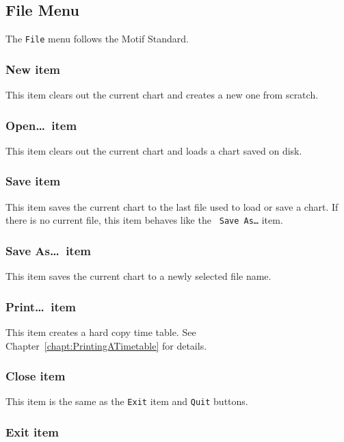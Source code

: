 \subsection{File Menu}

The {\tt File} menu follows the Motif Standard.

\subsubsection{New item}

This item clears out the current chart and creates a new one from scratch.

\subsubsection{Open\ldots\ item}

This item clears out the current chart and loads a chart saved on disk.

\subsubsection{Save item}

This item saves the current chart to the last file used to load or save
a chart.  If there is no current file, this item behaves like the {\tt
Save As\ldots} item.

\subsubsection{Save As\ldots\ item}

This item saves the current chart to a newly selected file name.

\subsubsection{Print\ldots\ item}

This item creates a hard copy time table.  See
Chapter~\ref{chapt:PrintingATimetable} for details.

\subsubsection{Close item}

This item is the same as the {\tt Exit} item and {\tt Quit} buttons.

\subsubsection{Exit item}

